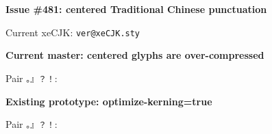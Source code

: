 \documentclass{article}
\begin{document}
{\Large\bfseries Issue \#481: centered Traditional Chinese punctuation}\par
Current xeCJK: \texttt{\csname ver@xeCJK.sty\endcsname}

\bigskip
\fontsize{25}{32}\selectfont
{}
\sbox{}
\sbox{}
\sbox{}
\sbox{}

\normalsize
\textcolor{red!70!black}{\bfseries Current master: centered glyphs are over-compressed}\par
\fbox{\usebox\currentbox}\par
Pair \texttt{。』？！}: \texttt{\the\wd\currentpairbox}

\medskip
\textcolor{teal!70!black}{\bfseries Existing prototype: optimize-kerning=true}\par
\fbox{\usebox\prototypebox}\par
Pair \texttt{。』？！}: \texttt{\the\wd\prototypepairbox}
\end{document}
